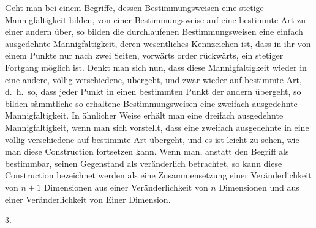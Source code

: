 \documentclass[a4paper,12pt]{article}
\begin{document}
Geht man bei einem Begriffe, dessen Bestimmungsweisen eine
stetige Mannigfaltigkeit bilden, von einer Bestimmungsweise auf
eine bestimmte Art zu einer andern \"{u}ber, so bilden die
durchlaufenen Bestimmungsweisen eine einfach ausgedehnte
Mannigfaltigkeit, deren wesentliches Kennzeichen ist, dass in ihr
von einem Punkte nur nach zwei Seiten, vorw\"{a}rts order
r\"{u}ckw\"{a}rts, ein stetiger Fortgang m\"{o}glich ist.  Denkt
man sich nun, dass diese Mannigfaltigkeit wieder in eine andere,
v\"{o}llig verschiedene, \"{u}bergeht, und zwar wieder auf
bestimmte Art, d.~h.\ so, dass jeder Punkt in einen bestimmten
Punkt der andern \"{u}bergeht, so bilden s\"{a}mmtliche so
erhaltene Bestimmungsweisen eine zweifach ausgedehnte
Mannigfaltigkeit.  In \"{a}hnlicher Weise erh\"{a}lt man eine
dreifach ausgedehnte Mannigfaltigkeit, wenn man sich vorstellt,
dass eine zweifach ausgedehnte in eine v\"{o}llig verschiedene
auf bestimmte Art \"{u}bergeht, und es ist leicht zu sehen, wie
man diese Construction fortsetzen kann.  Wenn man, anstatt den
Begriff als bestimmbar, seinen Gegenstand als ver\"{a}nderlich
betrachtet, so kann diese Construction bezeichnet werden als eine
Zusammensetzung einer Ver\"{a}nderlichkeit von $n + 1$
Dimensionen aus einer Ver\"{a}nderlichkeit von $n$ Dimensionen
und aus einer Ver\"{a}nderlichkeit von Einer Dimension.

\medbreak

\centerline{3.}

\nobreak\medskip
\end{document}
